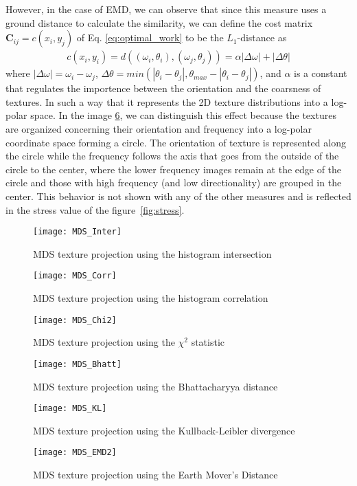 However, in the case of EMD, we can observe that since this measure uses a ground distance to calculate the similarity, we can define the cost matrix $\mathbf{C}_{ij} = c(x_i, y_j)$ of Eq. \ref{eq:optimal_work} to be the $L_1$-distance as
\begin{eqnarray} 
 c(x_i, y_i) = d((\omega_i, \theta_i), (\omega_j, \theta_j))=\alpha|\Delta \omega| + |\Delta \theta| \label{eq:ground_distance}
\end{eqnarray}
where $|\Delta \omega| = \omega_i - \omega_j$, $\Delta \theta=min(|\theta_i-\theta_j|, \theta_{max} - |\theta_i-\theta_j|)$, and $\alpha$ is a constant that regulates the importence between the orientation and the coarsness of textures. In such a way that it represents the 2D texture distributions into a log-polar space. 
In the image \ref{fig:MDS_EMD}, we can distinguish this effect because the textures are organized concerning their orientation and frequency into a log-polar coordinate space forming a circle. The orientation of texture is represented along the circle while the frequency follows the axis that goes from the outside of the circle to the center, where the lower frequency images remain at the edge of the circle and those with high frequency (and low directionality) are grouped in the center. This behavior is not shown with any of the other measures and is reflected in the stress value of the figure~\ref{fig:stress}.

\begin{figure}[!ht]
 \centering    
 \texttt{[image: MDS\_Inter]}
 \caption{MDS texture projection using the histogram intersection}
 \label{fig:MDS_Inter} 
\end{figure}

\begin{figure}[!ht]
 \centering    
 \texttt{[image: MDS\_Corr]}
 \caption{MDS texture projection using the histogram correlation}
 \label{fig:MDS_Corr} 
\end{figure}

\begin{figure}[!ht]
 \centering    
 \texttt{[image: MDS\_Chi2]}
 \caption{MDS texture projection using the $\chi^2$ statistic}
 \label{fig:MDS_Chi2} 
\end{figure}

\begin{figure}[!ht]
 \centering    
 \texttt{[image: MDS\_Bhatt]}
 \caption{MDS texture projection using the Bhattacharyya distance}
 \label{fig:MDS_Bhatt} 
\end{figure}

\begin{figure}[!ht]
 \centering    
 \texttt{[image: MDS\_KL]}
 \caption{MDS texture projection using the Kullback-Leibler divergence}
 \label{fig:MDS_KL} 
\end{figure}

\begin{figure}[!ht]
 \centering    
 \texttt{[image: MDS\_EMD2]}
 \caption{MDS texture projection using the Earth Mover's Distance}
 \label{fig:MDS_EMD} 
\end{figure}
